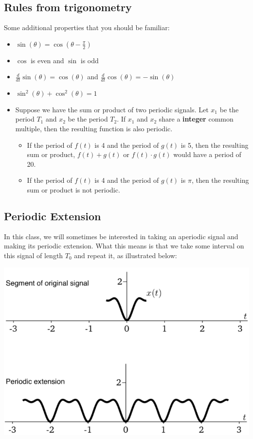 \documentclass[10pt]{article}
\begin{document}
\subsection*{Rules from trigonometry}
Some additional properties that you should be familiar:
\begin{itemize}
    \item $\sin(\theta) = \cos(\theta - \frac{\pi}{2})$
    \item $\cos$ is even and $\sin$ is odd
    \item $\frac{d}{dt} \sin(\theta) = \cos(\theta)$ and $\frac{d}{dt}\cos(\theta) = -\sin(\theta)$
    \item $\sin^2(\theta) + \cos^2(\theta) = 1$
    \item Suppose we have the sum or product of two periodic signals.  Let $x_1$ be the period $T_1$ and $x_2$ be the period $T_2$.  If $x_1$ and $x_2$ share a \textbf{integer} common multiple, then the resulting function is also periodic.
    \begin{itemize}
        \item If the period of $f(t)$ is 4 and the period of $g(t)$ is 5, then the resulting sum or product, $f(t) + g(t)$ or $f(t) \cdot g(t)$ would have a period of 20.
        \item If the period of $f(t)$ is 4 and the period of $g(t)$ is $\pi$, then the resulting sum or product is not periodic.
    \end{itemize}
\end{itemize}

\subsection*{Periodic Extension}
In this class, we will sometimes be interested in taking an aperiodic signal and making its periodic extension.  What this means is that we take some interval on this signal of length $T_0$ and repeat it, as illustrated below:
\begin{center}
    \includegraphics[scale=0.8]{W1_4.png}
\end{center}
\end{document}
